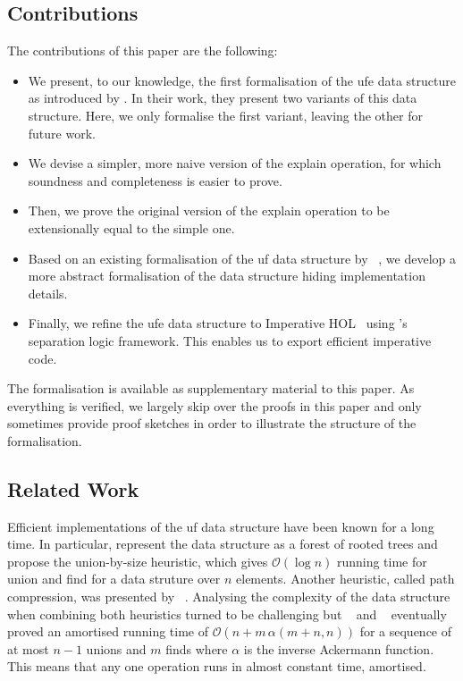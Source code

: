 \documentclass[
  sigplan,
  10pt,
  anonymous,
  review,
  ]{acmart}
\newcommand{\opunion}{union}
\newcommand{\opfind}{find}
\newcommand{\opexplain}{explain}
\begin{document}
\subsection{Contributions}
The contributions of this paper are the following:
\begin{itemize}
  \item We present, to our knowledge, the first formalisation of the \acrshort{ufe} data structure as introduced by \citeauthor{congcl_proofs}.
    In their work, they present two variants of this data structure.
    Here, we only formalise the first variant, leaving the other for future work.
  \item We devise a simpler, more naive version of the \opexplain{} operation, for which soundness and completeness is easier to prove. 
  \item Then, we prove the original version of the \opexplain{} operation to be extensionally equal to the simple one.
  \item Based on an existing formalisation of the \acrshort{uf} data structure by \citeauthor{uf_isabelle}~\cite{uf_isabelle},
    we develop a more abstract formalisation of the data structure hiding implementation details. 
  \item Finally, we refine the \acrshort{ufe} data structure to Imperative HOL~\cite{imperative_hol} using \citeauthor{uf_isabelle}'s~\cite{uf_isabelle} separation logic framework.
    This enables us to export efficient imperative code.
\end{itemize}
The formalisation is available as supplementary material to this paper.
As everything is verified, we largely skip over the proofs in this paper and only sometimes provide proof sketches in order to illustrate the structure of the formalisation.

\subsection{Related Work}
Efficient implementations of the \acrshort{uf} data structure have been known for a long time.
In particular, \citeauthor{uf_by_size} represent the data structure as a forest of rooted trees and propose the union-by-size heuristic, which gives $\mathcal{O}(\log n)$ running time for \opunion{} and \opfind{} for a data struture over $n$ elements.
Another heuristic, called path compression, was presented by \citeauthor{uf_compress}~\cite{uf_compress}.
Analysing the complexity of the data structure when combining both heuristics turned to be challenging but \citeauthor{uf_ub}~\cite{uf_ub} and \citeauthor{uf_ub_improved}~\cite{uf_ub_improved} eventually proved an amortised running time of $\mathcal{O}(n + m\, \alpha(m + n, n))$ for a sequence of at most $n - 1$ unions and $m$ finds where $\alpha$ is the inverse Ackermann function. 
This means that any one operation runs in almost constant time, amortised.
\end{document}
